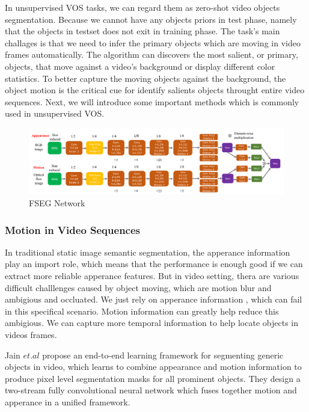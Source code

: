 In unsupervised VOS tasks, we can regard them as zero-shot video objects segmentation. Because we cannot have any objects priors
in test phase, namely that the objects in testset does not exit in training phase. The task's main challages is that we need to infer
the primary objects which are moving in video frames automatically. The algorithm can discovers the most salient, or primary, objects,
that move against a video's background or display different color statistics. To better capture the moving objects against the background,
the object motion is the critical cue for identify salients objects throught entire video sequences. Next, we will introduce some important
methods which is commonly used in unsupervised VOS.

\begin{figure}
    \begin{center}
    \includegraphics[width=\textwidth]{figure/FSEG_NET.png}
    \end{center}
    \caption{FSEG Network}
    \label{FSEG}
\end{figure}

\subsubsection{Motion in Video Sequences}
In traditional static image semantic segmentation, the apperance information play an import role, which means that 
the performance is enough good if we can extract more reliable apperance features. But in video setting, thera are various
difficult challlenges caused by object moving, which are motion blur and ambigious and occluated. We just rely on apperance information
, which can  fail in this specifical scenario. Motion information can greatly help reduce this ambigious. We can capture more temporal information
to help locate objects in videos frames.

Jain $et.al$ \cite{Jain2017FusionSeg} propose an end-to-end learning framework for segmenting generic objects in video,
which learns to combine appearance and motion information to produce pixel level segmentation masks for all prominent objects.
They design a two-stream fully convolutional neural network which fuses together motion and apperance in a unified framework.

